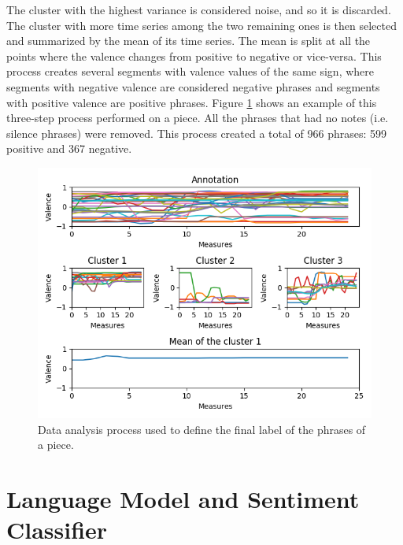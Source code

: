 The cluster with the highest variance is considered noise, and so it is discarded. The cluster with more time series among the two remaining ones is then selected and summarized by the mean of its time series. The mean is split at all the points where the valence changes from positive to negative or vice-versa. This process creates several segments with valence values of the same sign, where segments with negative valence are considered negative phrases and segments with positive valence are positive phrases. Figure \ref{fig:clustering} shows an example of this three-step process performed on a piece. All the phrases that had no notes (i.e. silence phrases) were removed. This process created a total of 966 phrases: 599 positive and 367 negative.

\begin{figure}[!h]
 \centering
 \includegraphics[width=0.9\columnwidth]{imgs/ismir19/clustering.png}
 \caption{Data analysis process used to define the final label of the phrases of a piece. }
 \label{fig:clustering}
\end{figure}


\section{Language Model and Sentiment Classifier}
\label{sec:model}

